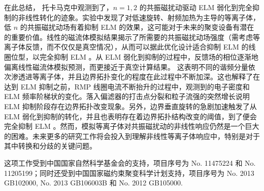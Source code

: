 
在此总结， \east 托卡马克中观测到了，$n=1,2$ 的共振磁扰动驱动 ELM 弱化到完全抑制的非线性转化的迹象。实验中发现了对低速旋转、射频加热为主导的等离子体，低 $n$ 的共振磁扰动场有着抑制 ELM 的效果，这可能对于未来的聚变设备有潜在的重要价值。线性的磁流体模拟结果揭示了所需要的共振磁扰动场强度（需考虑等离子体反馈，而不仅仅是真空情况），从而可以据此优化设计适合抑制 ELM 的线圈位型，以完全抑制 ELM 。从 ELM 弱化到抑制的过程中，反馈场的相位逐渐地偏离线性磁流体模拟预测，而更接近于真空计算结果。
这表明不同的谐频分量依次渗透进等离子体，并且边界拓扑变化的程度在此过程中不断加深。这也解释了在达到 ELM 抑制之前，RMP 线圈电流不断抬升的过程中，观测到的电子密度和 ELM 频率阶梯状的变化。落入偏滤器的打击点分裂和粒子流强的突然增长说明 ELM 抑制阶段存在边界拓扑改变现象。另外，边界垂直旋转的急剧加速触发了从 ELM 弱化到抑制的转化，并且也表明存在着边界拓扑结构改变的阈值，到了便会完全抑制 ELM 。然而，模拟等离子体对共振磁扰动的非线性响应仍然是一个巨大的困难。未来更多的研究工作将会投入到理解非线性等离子体响应中，特别是对于其中转换和分歧的关键问题。

这项工作受到中国国家自然科学基金会的支持，项目序号为 No. 11475224 和 No. 11205199；同时还受到中国国家磁约束聚变科学计划支持，项目序号为 No. 2013 GB102000, No. 2013 GB106003B 和 No. 2012 GB105000.

